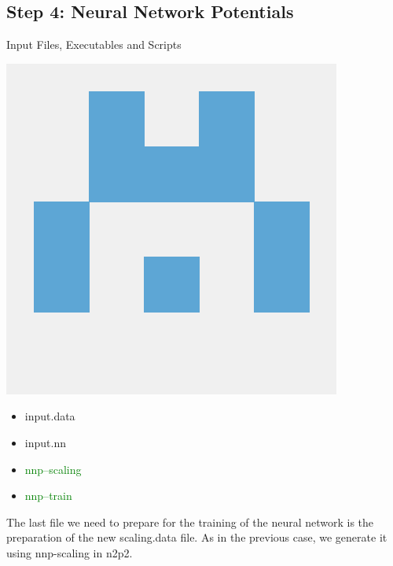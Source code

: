 \documentclass[12pt]{article}
\begin{document}
\subsection{Step 4: Neural Network Potentials}
\begin{mybox2}{{Input Files, Executables and Scripts}}
\begin{minipage}[c]{0.5\linewidth}
\includegraphics[scale=0.1]{n2p2.png}
\end{minipage}
\begin{minipage}[c]{0.5\linewidth}
\begin{itemize}
  \item input.data
   \item input.nn
     \item \textcolor{green}{nnp--scaling}
   \item \textcolor{green}{nnp--train}
\end{itemize}
\end{minipage}
\end{mybox2}
The last file we need to prepare for the training of the neural network is the preparation of the new scaling.data file. As in the previous case, we generate it using nnp-scaling in n2p2.
\end{document}
